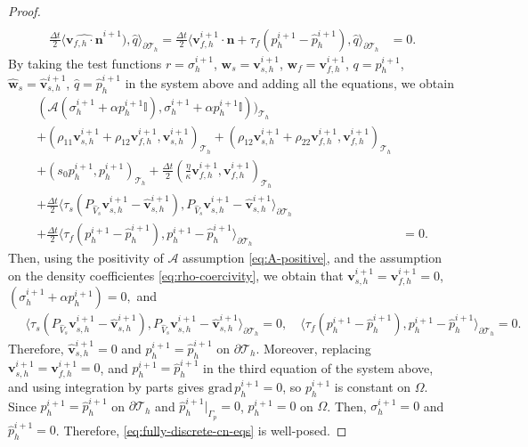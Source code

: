 \documentclass[10pt,a4paper]{amsart}
\newcommand{\Ael}{\mathcal{A}} %
\newcommand{\Id}{\mathbb{I}} %
\newcommand{\Thprod}[2]{( #1, #2 )_{\mathcal{T}_h}}
\newcommand{\grad}{\mathrm{grad}\,}
\newcommand{\pThprod}[2]{\langle #1, #2 \rangle_{\partial \mathcal{T}_{h}}}
\newcommand{\vect}[1]{\mathbf{#1}}
\begin{document}
\begin{proof}
\begin{align*}
			\\
			\frac{\Delta t}{2}\pThprod{\widehat{\vect{v}_{f,h}\cdot \vect{n}}^{i+1})}{\widehat{q}}=
			\frac{\Delta t}{2}\pThprod{\vect{v}_{f,h}^{i+1}\cdot \vect{n} + \tau_f (p_h^{i+1} - \widehat{p}_h^{i+1})}{\widehat{q}} &= 0 .
		\end{align*}
	By taking the test functions $r = \sigma_h^{i+1}$, $\vect{w}_{s} = \vect{v}_{s,h}^{i+1}$, $\vect{w}_{f} = \vect{v}_{f,h}^{i+1}$, $q = p_h^{i+1}$, $\widehat{\vect{w}}_{s} = \widehat{\vect{v}}_{s,h}^{i+1}$, $\widehat{q}=\widehat{p}_{h}^{i+1}$ in the system above and adding all the equations, we obtain
	\begin{align*}
		\Thprod{\Ael({\sigma}_{h}^{i+1} + \alpha {p}_{h}^{i+1} \Id)}{{\sigma}_{h}^{i+1} + \alpha {p}_{h}^{i+1} \Id)}
        \\
		+ \Thprod{\rho_{11}\vect{v}_{s,h}^{i+1} +\rho_{12}\vect{v}_{f,h}^{i+1}}{\vect{v}_{s,h}^{i+1}} +\Thprod{\rho_{12}\vect{v}_{s,h}^{i+1}+\rho_{22}\vect{v}_{f,h}^{i+1}}{\vect{v}_{f,h}^{i+1}} 
		\\
		+ \Thprod{s_{0}p_h^{i+1}}{p_h^{i+1}} + \frac{\Delta t}{2} \Thprod{\frac{\eta}{\kappa} \vect{v}_{f,h}^{i+1}}{\vect{v}_{f,h}^{i+1}} 
		\\
		+ \frac{\Delta t}{2}  \pThprod{\tau_{s} ({P_{\widehat{V}_s}} \vect{v}_{s,h}^{i+1} - \widehat{\vect{v}}_{s,h}^{i+1})}{P_{\widehat{V}_s}\vect{v}_{s,h}^{i+1}-\widehat{\vect{v}}_{s,h}^{i+1}}
		\\
		+ \frac{\Delta t}{2} \pThprod{\tau_{f} (p_{h}^{i+1} - \widehat{p}_{h}^{i+1})}{p_h^{i+1}-\widehat{p}_h^{i+1}}&=0 . 
	\end{align*}
	Then, using the positivity of $\Ael$ assumption \eqref{eq:A-positive},  and the assumption on the density coefficientes \eqref{eq:rho-coercivity}, we obtain that 
	$\vect{v}_{s,h}^{i+1}= \vect{v}_{f,h}^{i+1} =   0$, $ (\sigma_h^{i+1} + \alpha p_h^{i+1}) = 0, $ and 
	\begin{align*}
		\quad \pThprod{\tau_{s} ({P_{\widehat{V}_s}} \vect{v}_{s,h}^{i+1} - \widehat{\vect{v}}_{s,h}^{i+1})}{P_{\widehat{V}_s}\vect{v}_{s,h}^{i+1}-\widehat{\vect{v}}_{s,h}^{i+1}} = 0, \quad 
		\pThprod{\tau_{f} (p_{h}^{i+1} - \widehat{p}_{h}^{i+1})}{p_h^{i+1}-\widehat{p}_h^{i+1}} = 0. 
	\end{align*}
	Therefore, $\widehat{\vect{v}}_{s,h}^{i+1} = 0$ and $p_h^{i+1} = \widehat{p}_h^{i+1}$ on $\partial \mathcal{T}_h$. Moreover, replacing $\vect{v}_{s,h}^{i+1}= \vect{v}_{f,h}^{i+1} =   0$, and $p_h^{i+1} = \widehat{p}_h^{i+1}$ in the third equation of the system above, and using integration by parts gives $\grad p_h^{i+1} = 0$, so $p_h^{i+1}$ is constant on $\Omega$. Since $p_h^{i+1} = \widehat{p}_h^{i+1}$ on $\partial \mathcal{T}_h$ and $\widehat{p}_h^{i+1}|_{\Gamma_p} = 0$, $p_h^{i+1} = 0$ on $\Omega$. Then, $\sigma_h^{i+1} = 0$ and $\widehat{p}_h^{i+1} =0$. Therefore, \eqref{eq:fully-discrete-cn-eqs} is well-posed.
\end{proof}
\end{document}

